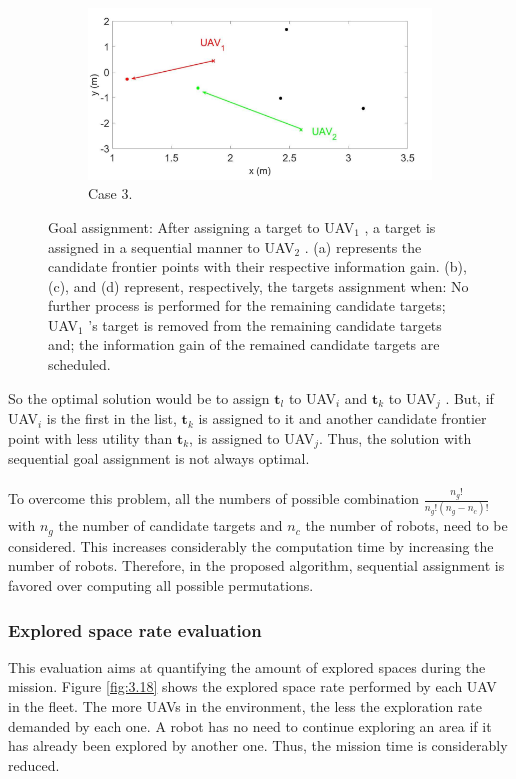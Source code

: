 \documentclass[11pt,openany]{book}
\begin{document}
\begin{figure}[H]
\begin{subfigure}[H]{0.6\linewidth}
        \label{fig:3.17c}
    \end{subfigure}
    \begin{subfigure}[H]{0.6\linewidth}
        \includegraphics[width=\linewidth]{assets/3_17_c.png}
        \caption{{Case 3.}}
        \label{fig:3.17d}
    \end{subfigure}
    \caption{Goal assignment: After assigning a target to UAV$_1$ , a target is assigned in a sequential manner to UAV$_2$ . (a) represents the candidate frontier points with their respective information gain. (b), (c), and (d) represent, respectively, the targets assignment when: No further process is performed for the remaining candidate targets; UAV$_1$ ’s target is removed from the remaining candidate targets and; the information gain of the remained candidate targets are scheduled.}
    \label{fig:3.17}
\end{figure}
So the optimal solution would be to assign $\mathbf{t}_l$ to UAV$_i$ and $\mathbf{t}_k$ to UAV$_j$ . But, if UAV$_i$ is the ﬁrst in the list, $\mathbf{t}_k$ is assigned to it and another candidate frontier point with less utility than $\mathbf{t}_k$, is assigned to UAV$_j$. Thus, the solution with sequential goal assignment is not always optimal.\\\\
To overcome this problem, all the numbers of possible combination $\frac{n_g!}{n_g!(n_g-n_c)!}$ with $n_g$ the number of candidate targets and $n_c$ the number of robots, need to be considered. This increases considerably the computation time by increasing the number of robots. Therefore, in the proposed algorithm, sequential assignment is favored over computing all possible permutations.
\subsubsection{Explored space rate evaluation}
This evaluation aims at quantifying the amount of explored spaces during the mission. Figure \ref{fig:3.18} shows the explored space rate performed by each UAV in the ﬂeet. The more UAVs in the environment, the less the exploration rate demanded by each one. A robot has no need to continue exploring an area if it has already been explored by another one. Thus, the mission time is considerably reduced.
\end{document}
